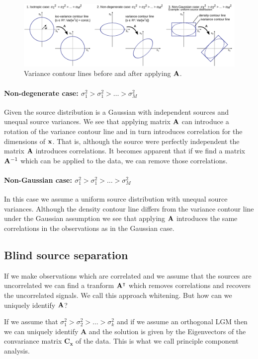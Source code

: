 \begin{figure}
	\includegraphics[width=\textwidth]{./lecture10/lineartransform_geometricmeaning.pdf}
	\caption{Variance contour lines before and after applying $\mathbf{A}$.}
	\label{fig:LGM_isovar}
\end{figure}

\paragraph{Non-degenerate case: $\sigma_1^2 > \sigma_1^2 > \dots > \sigma_M^2$}
Given the source distribution is a Gaussian with independent sources and unequal source variances.
We see that applying matrix $\mathbf{A}$ can introduce a rotation of the variance contour line and in turn
introduces correlation for the dimensions of $\mathbf{x}$. That is, although the source were perfectly 
independent the matrix $\mathbf{A}$ introduces correlations. It becomes apparent that if we find a matrix
$\mathbf{A}^{-1}$ which can be applied to the data, we can remove those correlations.

\paragraph{Non-Gaussian case: $\sigma_1^2 > \sigma_1^2 > \dots > \sigma_M^2$}
In this case we assume a uniform source distribution with unequal source variances. Although the
density contour line differs from the variance contour line under the Gaussian assumption we see
that applying $\mathbf{A}$ introduces the same correlations in the observations as in the Gaussian
case.

\subsection{Blind source separation}
If we make observations which are correlated and we assume that the sources are uncorrelated we
can find a tranform $\mathbf{A}^\intercal$ which removes correlations and recovers the uncorrelated signals.
We call this approach whitening. But how can we uniquely identify $\mathbf{A}$?

\begin{proposition}
	If we assume that $\sigma_1^2 > \sigma_2^2 > \dots > \sigma_k^2$ and if we assume an orthogonal LGM
	then we can uniquely identify $\mathbf{A}$ and the solution is given by the Eigenvectors of the convariance
	matrix $\mathbf{C_x}$ of the data. This is what we call principle component analysis.
\end{proposition}
